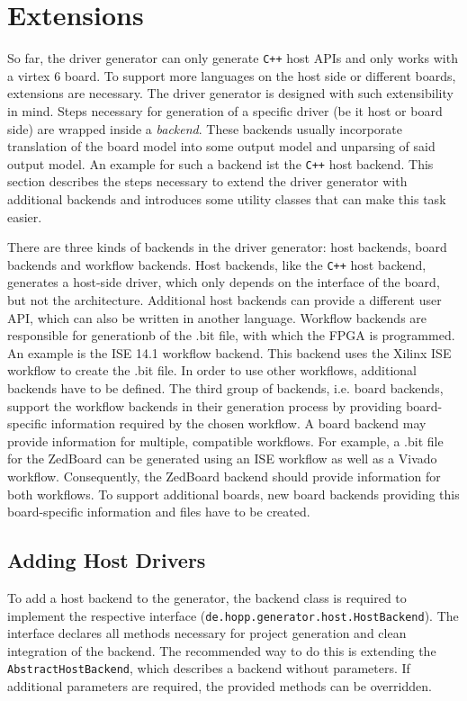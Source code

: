 \documentclass{report}
\begin{document}
\section{Extensions}
So far, the driver generator can only generate \texttt{C++} host APIs and only works with a virtex 6 board. To support more languages on the host side or different boards, extensions are necessary. The driver generator is designed with such extensibility in mind. Steps necessary for generation of a specific driver (be it host or board side) are wrapped inside a \textit{backend}. These backends usually incorporate translation of the board model into some output model and unparsing of said output model. An example for such a backend ist the \texttt{C++} host backend. This section describes the steps necessary to extend the driver generator with additional backends and introduces some utility classes that can make this task easier. 

There are three kinds of backends in the driver generator: host backends, board backends and workflow backends.
Host backends, like the \texttt{C++} host backend, generates a host-side driver, which only depends on the interface of the board, but not the architecture. Additional host backends can provide a different user API, which can also be written in another language.
Workflow backends are responsible for generationb of the .bit file, with which the FPGA is programmed. An example is the ISE 14.1 workflow backend. This backend uses the Xilinx ISE workflow to create the .bit file. In order to use other workflows, additional backends have to be defined.
The third group of backends, i.e. board backends, support the workflow backends in their generation process by providing board-specific information required by the chosen workflow. A board backend may provide information for multiple, compatible workflows. For example, a .bit file for the ZedBoard can be generated using an ISE workflow as well as a Vivado workflow. Consequently, the ZedBoard backend should provide information for both workflows. To support additional boards, new board backends providing this board-specific information and files have to be created.

\subsection{Adding Host Drivers}
To add a host backend to the generator, the backend class is required to implement the respective interface (\texttt{de.hopp.generator.host.HostBackend}). The interface declares all methods necessary for project generation and clean integration of the backend. The recommended way to do this is extending the \texttt{AbstractHostBackend}, which describes a backend without parameters. If additional parameters are required, the provided methods can be overridden.
\end{document}
